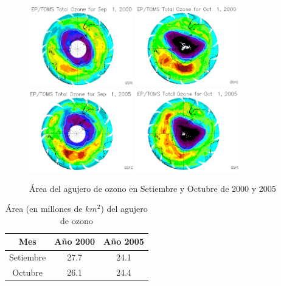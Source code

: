 \documentclass[a4paper]{article}
\begin{document}
\begin{figure}[h!]
\centering
\includegraphics[width=0.4\textwidth]{assets/hole_set2000.png}
\includegraphics[width=0.4\textwidth]{assets/hole_oct2000.png}
\includegraphics[width=0.4\textwidth]{assets/hole_set2005.png}
\includegraphics[width=0.4\textwidth]{assets/hole_oct2005.png}
\caption{\label{fig:area2000vs2005}Área del agujero de ozono en Setiembre y Octubre de 2000 y 2005}
\end{figure}

\bigskip

\begin{table}[h!]
\bigskip
\centering
\begin{tabular}{c | c | c}
Mes & Año 2000 & Año 2005 \\\hline
Setiembre & 27.7  & 24.1\\
Octubre & 26.1 & 24.4\\
\end{tabular}
\caption{\label{table:area2000vs2005}Área (en millones de $km^2$) del agujero de ozono}
\end{table}
\end{document}
